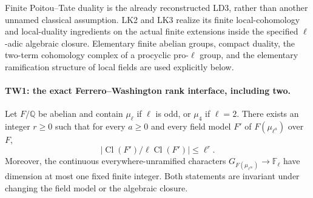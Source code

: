 Finite Poitou--Tate duality is the already reconstructed LD3, rather
than another unnamed classical assumption.  LK2 and LK3 realize its
finite local-cohomology and local-duality ingredients on the actual
finite extensions inside the specified $\ell$-adic algebraic closure.
Elementary finite abelian groups, compact duality, the two-term
cohomology complex of a procyclic pro-$\ell$ group, and the elementary
ramification structure of local fields are used explicitly below.

\paragraph{TW1: the exact Ferrero--Washington rank interface, including two.}
\label{claim:TW1}
Let $F/\mathbb Q$ be abelian and contain $\mu_\ell$ if $\ell$ is odd,
or $\mu_4$ if $\ell=2$.  There exists an integer $r\ge0$ such that
for every $a\ge0$ and every field model $F'$ of
$F(\mu_{\ell^a})$ over $F$,
\[
 \left|\operatorname{Cl}(F')/\ell\operatorname{Cl}(F')\right|
       \le\ell^r.
 \tag{TW.3}
\]
Moreover, the continuous everywhere-unramified characters
$G_{F(\mu_{\ell^\infty})}\to\mathbb F_\ell$ have dimension at most
one fixed finite integer.  Both statements are invariant under
changing the field model or the algebraic closure.

